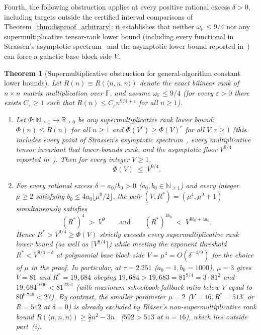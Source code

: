 \documentclass[11pt,a4paper]{article}
\theoremstyle{plain}
\newtheorem{theorem}{Theorem}[section]
\theoremstyle{definition}
\theoremstyle{remark}
\newcommand{\N}{\mathbb{N}}
\newcommand{\R}{\mathbb{R}}
\newcommand{\F}{\mathbb{F}}
\begin{document}
Fourth, the following obstruction applies at every positive rational excess $\delta > 0$, including targets outside the certified interval comparisons of Theorem~\ref{thm:disproof_arbitrary}: it establishes that neither $\omega_{\F} \le 9/4$ nor any supermultiplicative tensor-rank lower bound (including every functional in Strassen's asymptotic spectrum~\cite{Strassen1988} and the asymptotic lower bound reported in~\cite{OpenAI2026Lower}) can force a galactic base block side $V$.

\begin{theorem}[Supermultiplicative obstruction for general-algorithm constant lower bounds]
\label{thm:supermult_obstruction}
Let $R(n) \equiv R(\langle n, n, n\rangle)$ denote the exact bilinear rank of $n \times n$ matrix multiplication over $\F$, and assume $\omega_{\F} \le 9/4$ (for every $\varepsilon > 0$ there exists $C_\varepsilon \ge 1$ such that $R(n) \le C_\varepsilon n^{9/4 + \varepsilon}$ for all $n \ge 1$).
\begin{enumerate}[label=(\roman*)]
\item Let $\Phi : \N_{\ge 1} \to \R_{\ge 0}$ be any supermultiplicative rank lower bound: $\Phi(n) \le R(n)$ for all $n \ge 1$ and $\Phi(V^r) \ge \Phi(V)^r$ for all $V, r \ge 1$ (this includes every point of Strassen's asymptotic spectrum~\cite{Strassen1988}, every multiplicative tensor invariant that lower-bounds rank, and the asymptotic floor $V^{9/4}$ reported in~\cite{OpenAI2026Lower}). Then for every integer $V \ge 1$,
\begin{equation}
    \Phi(V) \;\le\; V^{9/4} .
    \label{eq:supermult_cap}
\end{equation}
\item For every rational excess $\delta = a_0/b_0 > 0$ ($a_0, b_0 \in \N_{\ge 1}$) and every integer $\mu \ge 2$ satisfying $b_0 \le 4 a_0 \lfloor \mu^9 / 2 \rfloor$, the pair $(V, R^*) = (\mu^4, \mu^9 + 1)$ simultaneously satisfies
\begin{equation}
    (R^*)^4 \;>\; V^9 \qquad\text{and}\qquad (R^*)^{4 b_0} \;<\; V^{9 b_0 + 4 a_0} .
    \label{eq:small_V_consistent}
\end{equation}
Hence $R^* > V^{9/4} \ge \Phi(V)$ strictly exceeds every supermultiplicative rank lower bound (as well as $\lceil V^{9/4}\rceil$) while meeting the exponent threshold $R^* < V^{9/4 + \delta}$ at polynomial base block side $V = \mu^4 = O(\delta^{-4/9})$ for the choice of $\mu$ in the proof. In particular, at $\tau = 2.251$ ($a_0 = 1, b_0 = 1000$), $\mu = 3$ gives $V = 81$ and $R^* = 19{,}684$ obeying $19{,}684 > 19{,}683 = 81^{9/4} = 3 \cdot 81^2$ and $19{,}684^{1000} < 81^{2251}$ (with maximum schoolbook fallback ratio below $V$ equal to $80^{0.749} < 27$). By contrast, the smaller parameter $\mu = 2$ ($V = 16, R^* = 513$, or $R = 512$ at $\delta = 0$) is already excluded by Bl\"aser's non-supermultiplicative rank bound $R(\langle n, n, n\rangle) \ge \frac{5}{2}n^2 - 3n$~\cite{Blaser1999} ($592 > 513$ at $n = 16$), which lies outside part~(i).
\end{enumerate}
\end{theorem}
\end{document}

